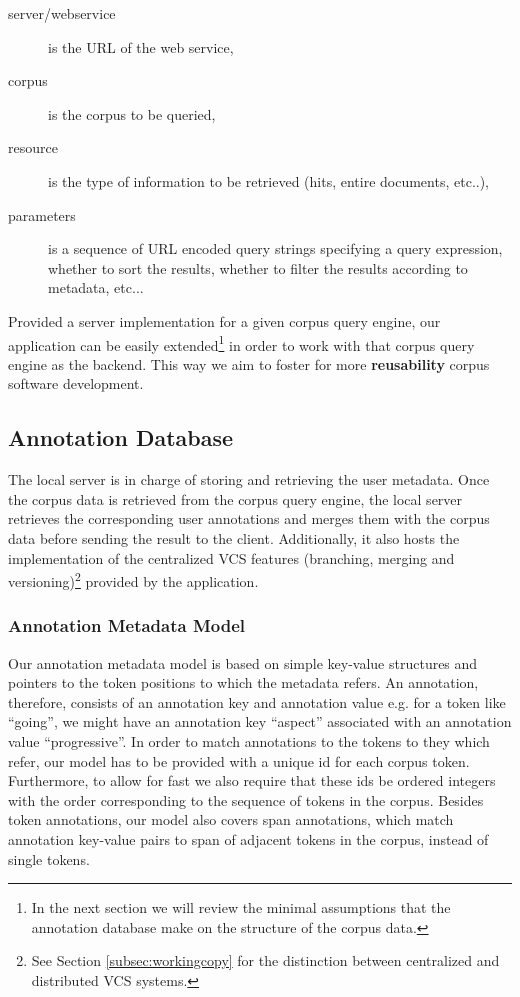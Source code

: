 \documentclass{sig-alternate}
\begin{document}
\begin{description}
\item [server/webservice] is the URL of the web service,
\item [corpus] is the corpus to be queried,
\item [resource] is the type of information to be retrieved (hits, entire documents, etc..),
\item [parameters] is a sequence of URL encoded query strings specifying a query expression,
  whether to sort the results, whether to filter the results according to metadata, etc...
\end{description}

Provided a server implementation for a given corpus query engine, our application can be easily
extended\footnote{
  In the next section we will review the minimal assumptions that the annotation database make on
the structure of the corpus data.
} in order to work with that corpus query engine as the backend. This way we aim to
foster for more \textbf{reusability} corpus software development.

\subsection{Annotation Database}\label{subsec:db}
The local server is in charge of storing and retrieving the user metadata. Once the corpus data
is retrieved from the corpus query engine, the local server retrieves the corresponding user
annotations and merges them with the corpus data before sending the result to the client.
Additionally, it also hosts the implementation of the centralized VCS features (branching,
merging and versioning)\footnote{
  See Section \ref{subsec:workingcopy} for the distinction between centralized and distributed
  VCS systems.
} provided by the application.

\subsubsection{Annotation Metadata Model}\label{subsec:datamodel}

Our annotation metadata model is based on simple key-value structures and pointers to the token
positions to which the metadata refers. An annotation, therefore, consists of an annotation key
and annotation value \textemdash e.g. for a token like ``going'', we might have an annotation
key ``aspect'' associated with an annotation value ``progressive''. In order to match annotations
to the tokens to they which refer, our model has to be provided with a unique id for each
corpus token. Furthermore, to allow for fast we also require that these ids be ordered integers
\textemdash with the order corresponding to the sequence of tokens in the corpus.
Besides token annotations, our model also covers span annotations, which match annotation
key-value pairs to span of adjacent tokens in the corpus, instead of single tokens.
\end{document}
